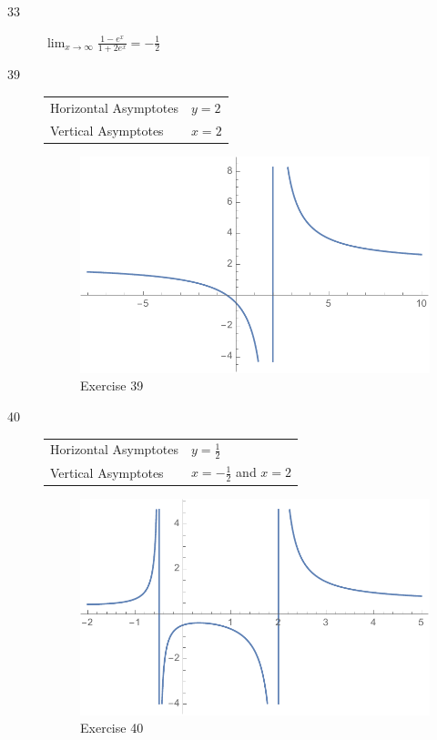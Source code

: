 \documentclass[letterpaper, landscape]{exam}
\begin{document}
\begin{description}
      \item[33] 
        $\lim_{x \to \infty} \frac{1 - e^x}{1 + 2e^x} = \boxed{ - \frac{1}{2} }$

      \item[39]
        \begin{tabular}[H]{ll}
          \toprule
          Horizontal Asymptotes & $y = 2$ \\
          Vertical Asymptotes   & $x = 2$ \\
          \bottomrule
        \end{tabular}

        \begin{figure}[H]
          \centering
          \includegraphics[scale = 0.5]{ex39.pdf}
          \caption{Exercise 39}
          \label{fig:ex39}
        \end{figure}

      \item[40]
        \begin{tabular}[H]{ll}
          \toprule
          Horizontal Asymptotes & $y = \frac{1}{2}$ \\
          Vertical Asymptotes   & $x = - \frac{1}{2}$ and $x = 2$ \\
          \bottomrule
        \end{tabular}

        \begin{figure}[H]
          \centering
          \includegraphics[scale = 0.5]{ex40.pdf}
          \caption{Exercise 40}
          \label{fig:ex40}
        \end{figure}


\end{description}
\end{document}
